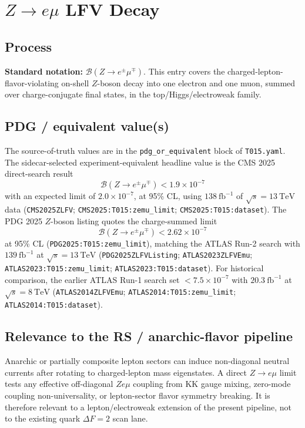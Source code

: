 
\section{\texorpdfstring{\(Z\to e\mu\)}{Z -> e mu} LFV Decay}

\subsection*{Process}
\textbf{Standard notation:} \(\mathcal{B}(Z\to e^\pm\mu^\mp)\).
This entry covers the charged-lepton-flavor-violating on-shell \(Z\)-boson
decay into one electron and one muon, summed over charge-conjugate final
states, in the top/Higgs/electroweak family.

\subsection*{PDG / equivalent value(s)}
The source-of-truth values are in the \texttt{pdg\_or\_equivalent} block of
\texttt{T015.yaml}.  The sidecar-selected experiment-equivalent headline value
is the CMS 2025 direct-search result
\[
  \mathcal{B}(Z\to e^\pm\mu^\mp) < 1.9\times 10^{-7}
\]
with an expected limit of \(2.0\times 10^{-7}\), at 95\% CL, using
\(138~\mathrm{fb}^{-1}\) of \(\sqrt{s}=13~\mathrm{TeV}\) data
(\texttt{CMS2025ZLFV}; \texttt{CMS2025:T015:zemu\_limit};
\texttt{CMS2025:T015:dataset}).
The PDG 2025 \(Z\)-boson listing quotes the charge-summed limit
\[
  \mathcal{B}(Z\to e^\pm\mu^\mp) < 2.62\times 10^{-7}
\]
at 95\% CL (\texttt{PDG2025:T015:zemu\_limit}), matching the ATLAS Run-2
search with \(139~\mathrm{fb}^{-1}\) at \(\sqrt{s}=13~\mathrm{TeV}\)
(\texttt{PDG2025ZLFVListing}; \texttt{ATLAS2023ZLFVEmu};
\texttt{ATLAS2023:T015:zemu\_limit}; \texttt{ATLAS2023:T015:dataset}).
For historical comparison, the earlier ATLAS Run-1 search set
\(<7.5\times 10^{-7}\) with \(20.3~\mathrm{fb}^{-1}\) at
\(\sqrt{s}=8~\mathrm{TeV}\) (\texttt{ATLAS2014ZLFVEmu};
\texttt{ATLAS2014:T015:zemu\_limit}; \texttt{ATLAS2014:T015:dataset}).

\subsection*{Relevance to the RS / anarchic-flavor pipeline}
Anarchic or partially composite lepton sectors can induce non-diagonal neutral
currents after rotating to charged-lepton mass eigenstates.  A direct
\(Z\to e\mu\) limit tests any effective off-diagonal \(Z e\mu\) coupling from
KK gauge mixing, zero-mode coupling non-universality, or lepton-sector flavor
symmetry breaking.  It is therefore relevant to a lepton/electroweak extension
of the present pipeline, not to the existing quark \(\Delta F=2\) scan lane.

